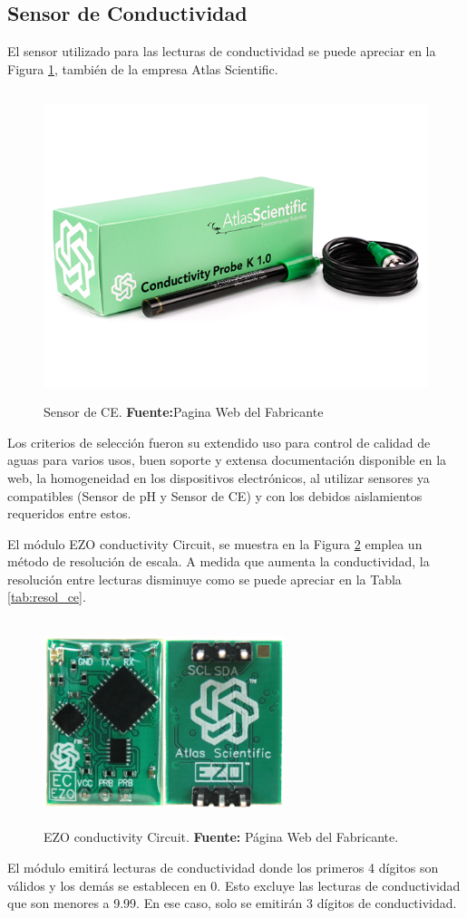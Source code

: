 \subsection{Sensor de Conductividad}
El sensor utilizado para las lecturas de conductividad se puede apreciar en la Figura \ref{fig:4.12}, también de la empresa Atlas Scientific.
\begin{figure}[t]
\centering
	\includegraphics[width=150mm, height=90mm]{Imagenes/2021/imag24.png}%
	\caption[Sensor de CE]{Sensor de CE.  \textbf{Fuente:}Pagina Web del Fabricante \cite{atlasce}}
	\label{fig:4.12}
\end{figure}
Los criterios de selección fueron su extendido uso para control de calidad de aguas para varios usos, buen soporte y extensa documentación disponible en la web, la homogeneidad en los dispositivos electrónicos, al utilizar sensores ya compatibles (Sensor de pH y Sensor de CE) y con los debidos aislamientos requeridos entre estos.  
 
El módulo EZO conductivity Circuit, se muestra en la Figura \ref{fig:4.13} emplea un método de resolución de escala. A medida que aumenta la conductividad, la resolución entre lecturas disminuye como se puede apreciar en la Tabla \ref{tab:resol_ce}.
\begin{figure}[b]
    \centering
    \includegraphics[width=70mm, height=60mm]{Imagenes/2021/imag28.png}
    \caption[EZO conductivity Circuit]{EZO conductivity Circuit. \textbf{Fuente: }Página Web del Fabricante.}
    \label{fig:4.13}
\end{figure}
El módulo emitirá lecturas de conductividad donde los primeros 4 dígitos son válidos y los demás se establecen en 0. Esto excluye las lecturas de conductividad que son menores a 9.99. En ese caso, solo se emitirán 3 dígitos de conductividad.

